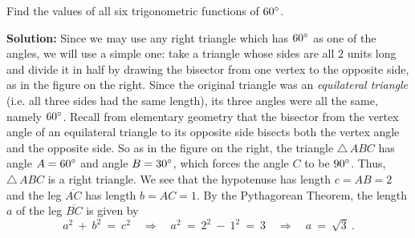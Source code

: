 \divider
\newpage
\begin{exmp}\label{exmp:funcs60}
\noindent Find the values of all six trigonometric functions of $60^\circ$.\vspace{1mm}
 \par\noindent\textbf{Solution:} Since we may use any right triangle which has $60^\circ$ as one of
 the angles, we will use a simple one: take a triangle whose sides are all $2$ units long and divide
 it in half by drawing the bisector from one vertex to the opposite side, as in the figure on the
 right. Since the original triangle was an
 \emph{equilateral triangle} (i.e.
 all three sides had the same length), its three angles were all the same, namely $60^\circ$.
 Recall from elementary geometry that the bisector from the vertex angle of an equilateral triangle
 to its opposite side bisects both the vertex angle and the opposite side. So as in the figure on
 the right, the triangle $\triangle\,ABC$ has angle $A = 60^\circ$ and angle $B = 30^\circ$,
 which forces the angle $C$ to be $90^\circ$. Thus, $\triangle\,ABC$ is a right triangle. We see
 that the hypotenuse has length $c = AB = 2$ and the leg $\overline{AC}$ has length $b = AC = 1$.
 By the Pythagorean Theorem, the length $a$ of the leg $\overline{BC}$ is given by
 \begin{displaymath}
  a^2 ~+~ b^2 ~=~ c^2 \quad\Rightarrow\quad a^2 ~=~ 2^2 ~-~ 1^2 ~=~ 3
   \quad\Rightarrow\quad a ~=~ \sqrt{3} ~.
 \end{displaymath}

\end{exmp}
